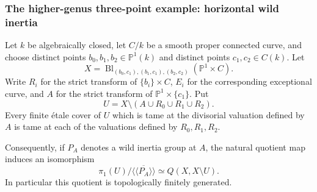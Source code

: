 \subsubsection{The higher-genus three-point example: horizontal wild inertia}

\begin{proposition}
\label{D:Schroer-horizontal-tame}
Let $k$ be algebraically closed, let $C/k$ be a smooth proper
connected curve, and choose distinct points $b_0,b_1,b_2\in\mathbb P^1(k)$
and distinct points $c_1,c_2\in C(k)$.  Let
\[
 X=\operatorname{Bl}_{(b_0,c_1),(b_1,c_1),(b_2,c_2)}
       (\mathbb P^1\times C).
\]
Write $R_i$ for the strict transform of $\{b_i\}\times C$, $E_i$
for the corresponding exceptional curve, and $A$ for the strict
transform of $\mathbb P^1\times\{c_1\}$.  Put
\[
 U=X\setminus(A\cup R_0\cup R_1\cup R_2).
\]
Every finite \'etale cover of $U$ which is tame at the divisorial
valuation defined by $A$ is tame at each of the valuations defined
by $R_0,R_1,R_2$.

Consequently, if $P_A$ denotes a wild inertia group at $A$, the
natural quotient map induces an isomorphism
\[
 \pi_1(U)/\overline{\langle\!\langle P_A\rangle\!\rangle}
 \simeq Q(X,X\setminus U).
\]
In particular this quotient is topologically finitely generated.
\end{proposition}

